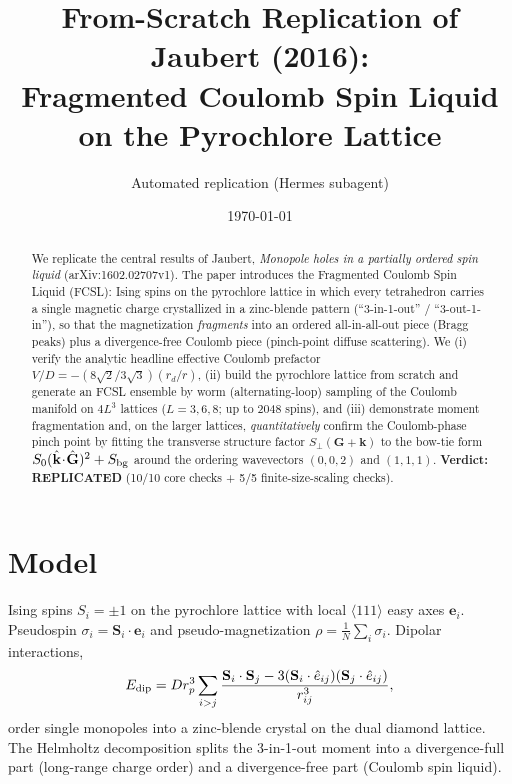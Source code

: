 \documentclass[11pt]{article}
\title{From-Scratch Replication of Jaubert (2016):\\
Fragmented Coulomb Spin Liquid on the Pyrochlore Lattice}
\author{Automated replication (Hermes subagent)}
\date{\today}
\begin{document}
\maketitle

\begin{abstract}
We replicate the central results of Jaubert, \emph{Monopole holes in a partially
ordered spin liquid} (arXiv:1602.02707v1). The paper introduces the Fragmented
Coulomb Spin Liquid (FCSL): Ising spins on the pyrochlore lattice in which every
tetrahedron carries a single magnetic charge crystallized in a zinc-blende pattern
(``3-in-1-out'' / ``3-out-1-in''), so that the magnetization \emph{fragments} into an
ordered all-in-all-out piece (Bragg peaks) plus a divergence-free Coulomb piece
(pinch-point diffuse scattering). We (i) verify the analytic headline effective Coulomb
prefactor $V/D=-(8\sqrt2/3\sqrt3)(r_d/r)$, (ii) build the pyrochlore lattice from
scratch and generate an FCSL ensemble by worm (alternating-loop) sampling of the
Coulomb manifold on $4L^3$ lattices ($L=3,6,8$; up to 2048 spins), and (iii)
demonstrate moment fragmentation and, on the larger lattices, \emph{quantitatively}
confirm the Coulomb-phase pinch point by fitting the transverse structure factor
$S_\perp(\mathbf G+\mathbf k)$ to the bow-tie form $S_0(\hat{\mathbf k}\!\cdot\!\hat{\mathbf G})^2+S_{\rm bg}$
around the ordering wavevectors $(0,0,2)$ and $(1,1,1)$. \textbf{Verdict: REPLICATED}
(10/10 core checks + 5/5 finite-size-scaling checks).
\end{abstract}

\section{Model}
Ising spins $S_i=\pm1$ on the pyrochlore lattice with local $\langle111\rangle$ easy
axes $\mathbf e_i$. Pseudospin $\sigma_i=\mathbf S_i\cdot\mathbf e_i$ and
pseudo-magnetization $\rho=\frac1N\sum_i\sigma_i$. Dipolar interactions,
\begin{equation}
E_{\rm dip}=D r_p^3\sum_{i>j}
\frac{\mathbf S_i\cdot\mathbf S_j-3(\mathbf S_i\cdot\hat e_{ij})(\mathbf S_j\cdot\hat e_{ij})}{r_{ij}^3},
\end{equation}
order single monopoles into a zinc-blende crystal on the dual diamond lattice. The
Helmholtz decomposition splits the 3-in-1-out moment into a divergence-full part
(long-range charge order) and a divergence-free part (Coulomb spin liquid).
\end{document}
